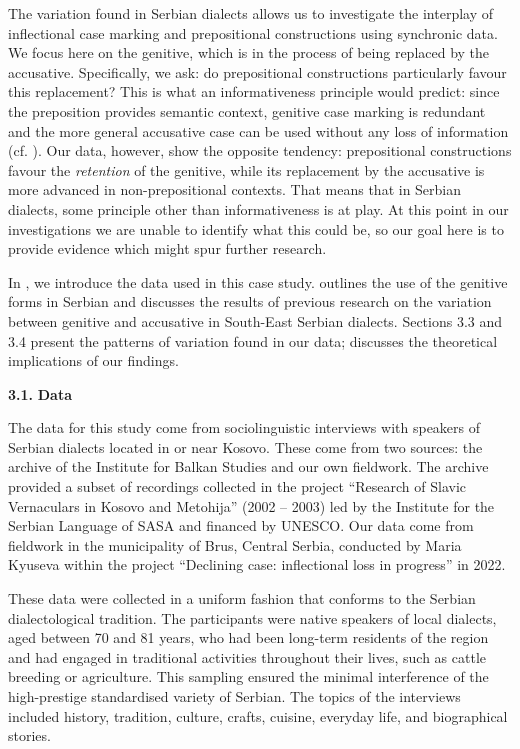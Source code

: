\documentclass[output=paper]{langscibook}
\begin{document}
The variation found in Serbian dialects allows us to investigate the interplay of inflectional case marking and prepositional constructions using synchronic data. We focus here on the genitive, which is in the process of being replaced by the accusative. Specifically, we ask: do prepositional constructions particularly favour this replacement? This is what an informativeness principle would predict: since the preposition provides semantic context, genitive case marking is redundant and the more general accusative case can be used without any loss of information (cf. \citealt{Comrie1977,Comrie1989}). Our data, however, show the opposite tendency: prepositional constructions favour the \textit{retention} of the genitive, while its replacement by the accusative is more advanced in non-prepositional contexts.  That means that in Serbian dialects, some principle other than informativeness is at play. At this point in our investigations we are unable to identify what this could be, so our goal here is to provide evidence which might spur further research. 

In , we introduce the data used in this case study.  outlines the use of the genitive forms in Serbian and discusses the results of previous research on the variation between genitive and accusative in South-East Serbian dialects. Sections 3.3 and 3.4 present the patterns of variation found in our data;  discusses the theoretical implications of our findings.

\textbf{3.1.} \textbf{Data}

The data for this study come from sociolinguistic interviews with speakers of Serbian dialects located in or near Kosovo. These come from two sources: the archive of the Institute for Balkan Studies and our own fieldwork. The archive provided a subset of recordings collected in the project “Research of Slavic Vernaculars in Kosovo and Metohija” (2002 – 2003) led by the Institute for the Serbian Language of SASA and financed by UNESCO. Our data come from fieldwork in the municipality of Brus, Central Serbia, conducted by Maria Kyuseva within the project “Declining case: inflectional loss in progress” in 2022. 

These data were collected in a uniform fashion that conforms to the Serbian dialectological tradition. The participants were native speakers of local dialects, aged between 70 and 81 years, who had been long-term residents of the region and had engaged in traditional activities throughout their lives, such as cattle breeding or agriculture. This sampling ensured the minimal interference of the high-prestige standardised variety of Serbian. The topics of the interviews included history, tradition, culture, crafts, cuisine, everyday life, and biographical stories.
\end{document}
